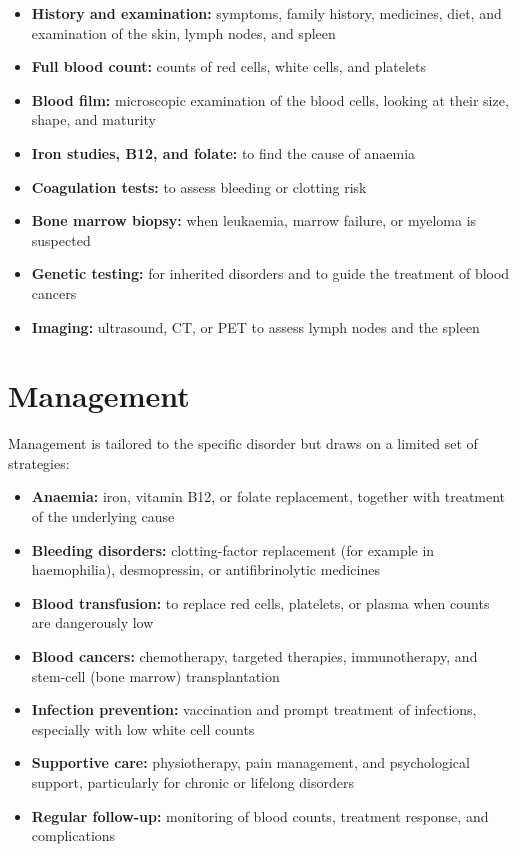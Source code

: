 \begin{itemize}
    \item \textbf{History and examination:} symptoms, family history, medicines, diet, and examination of the skin, lymph nodes, and spleen
    \item \textbf{Full blood count:} counts of red cells, white cells, and platelets
    \item \textbf{Blood film:} microscopic examination of the blood cells, looking at their size, shape, and maturity
    \item \textbf{Iron studies, B12, and folate:} to find the cause of anaemia
    \item \textbf{Coagulation tests:} to assess bleeding or clotting risk
    \item \textbf{Bone marrow biopsy:} when leukaemia, marrow failure, or myeloma is suspected
    \item \textbf{Genetic testing:} for inherited disorders and to guide the treatment of blood cancers
    \item \textbf{Imaging:} ultrasound, CT, or PET to assess lymph nodes and the spleen
\end{itemize}

\section*{Management}
Management is tailored to the specific disorder but draws on a limited set of strategies:

\begin{itemize}
    \item \textbf{Anaemia:} iron, vitamin B12, or folate replacement, together with treatment of the underlying cause
    \item \textbf{Bleeding disorders:} clotting-factor replacement (for example in haemophilia), desmopressin, or antifibrinolytic medicines
    \item \textbf{Blood transfusion:} to replace red cells, platelets, or plasma when counts are dangerously low
    \item \textbf{Blood cancers:} chemotherapy, targeted therapies, immunotherapy, and stem-cell (bone marrow) transplantation
    \item \textbf{Infection prevention:} vaccination and prompt treatment of infections, especially with low white cell counts
    \item \textbf{Supportive care:} physiotherapy, pain management, and psychological support, particularly for chronic or lifelong disorders
    \item \textbf{Regular follow-up:} monitoring of blood counts, treatment response, and complications
\end{itemize}

